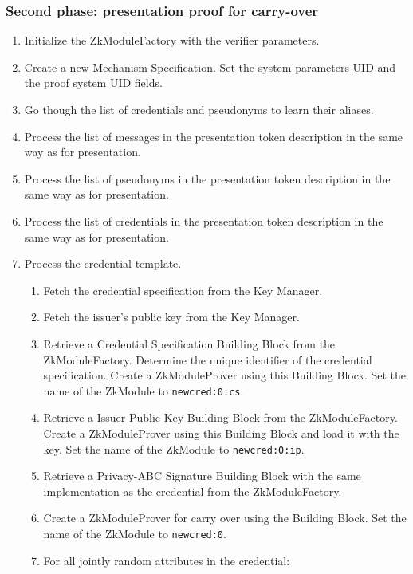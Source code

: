   \subsubsection{Second phase: presentation proof for carry-over}
  \begin{enumerate}
      \item Initialize the ZkModuleFactory with the verifier parameters.
      \item Create a new Mechanism Specification. Set the system parameters UID and the proof system UID fields.
      \item Go though the list of credentials and pseudonyms to learn their aliases.
      \item Process the list of messages in the presentation token description in the same way as for presentation.
      \item Process the list of pseudonyms in the presentation token description in the same way as for presentation.
      \item Process the list of credentials in the presentation token description in the same way as for presentation.
      \item Process the credential template.
        \begin{enumerate}
          \item Fetch the credential specification from the Key Manager.
          \item Fetch the issuer's public key from the Key Manager.
          \item Retrieve a Credential Specification Building Block from the ZkModuleFactory. Determine the unique identifier
            of the credential specification. Create a ZkModuleProver using this Building Block. Set the name of the ZkModule to
            \texttt{newcred:0:cs}.
          \item Retrieve a Issuer Public Key Building Block from the ZkModuleFactory.
            Create a ZkModuleProver using this Building Block and load it with the key. Set the name of the ZkModule to
            \texttt{newcred:0:ip}.
          \item Retrieve a Privacy-ABC Signature Building Block with the same implementation as the credential from the ZkModuleFactory.
          \item Create a ZkModuleProver for carry over using the Building Block. Set the name of the ZkModule to
            \texttt{newcred:0}.
          \item For all jointly random attributes in the credential: \notimplemented

\end{enumerate}
\end{enumerate}

